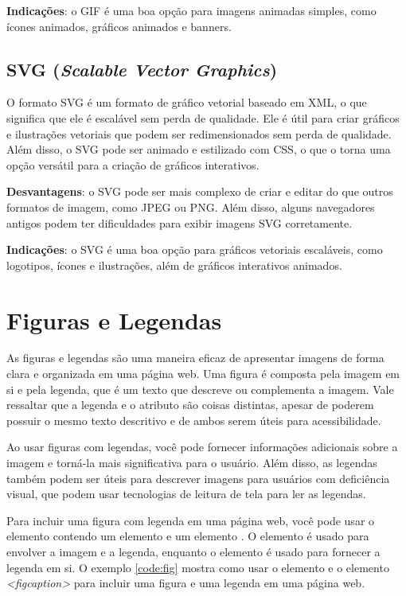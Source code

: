 \textbf{Indicações}: o GIF é uma boa opção para imagens animadas simples, como ícones animados, gráficos animados e banners.

\subsection{SVG (\textit{Scalable Vector Graphics})}

O formato SVG é um formato de gráfico vetorial baseado em XML, o que significa que ele é escalável sem perda de qualidade. Ele é útil para criar gráficos e ilustrações vetoriais que podem ser redimensionados sem perda de qualidade. Além disso, o SVG pode ser animado e estilizado com CSS, o que o torna uma opção versátil para a criação de gráficos interativos.

\textbf{Desvantagens}: o SVG pode ser mais complexo de criar e editar do que outros formatos de imagem, como JPEG ou PNG. Além disso, alguns navegadores antigos podem ter dificuldades para exibir imagens SVG corretamente.

\textbf{Indicações}: o SVG é uma boa opção para gráficos vetoriais escaláveis, como logotipos, ícones e ilustrações, além de gráficos interativos animados.

\section{Figuras e Legendas}

As figuras e legendas são uma maneira eficaz de apresentar imagens de forma clara e organizada em uma página web. Uma figura é composta pela imagem em si e pela legenda, que é um texto que descreve ou complementa a imagem. Vale ressaltar que a legenda e o atributo  são coisas distintas, apesar de poderem possuir o mesmo texto descritivo e de ambos serem úteis para acessibilidade.

Ao usar figuras com legendas, você pode fornecer informações adicionais sobre a imagem e torná-la mais significativa para o usuário. Além disso, as legendas também podem ser úteis para descrever imagens para usuários com deficiência visual, que podem usar tecnologias de leitura de tela para ler as legendas.

Para incluir uma figura com legenda em uma página web, você pode usar o elemento  contendo um elemento  e um elemento . O elemento  é usado para envolver a imagem e a legenda, enquanto o elemento  é usado para fornecer a legenda em si. O exemplo \ref{code:fig} mostra como usar o elemento  e o elemento \textit{<figcaption>} para incluir uma figura e uma legenda em uma página web.

